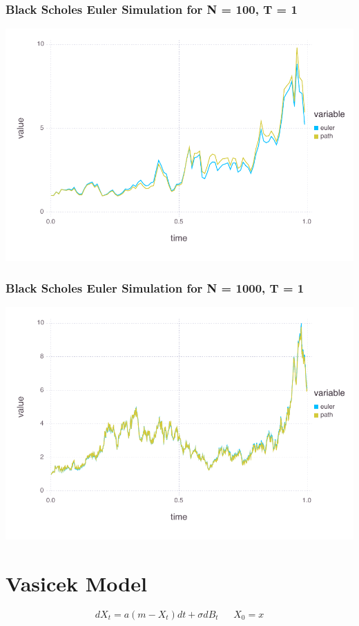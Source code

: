 \documentclass[a4paper,12pt]{article}
\begin{document}
\subsubsection*{Black Scholes Euler Simulation for N = 100, T = 1}
\includegraphics[width=\linewidth]{figures/problemset_3_1.pdf}



\subsubsection*{Black Scholes Euler Simulation for N = 1000, T = 1}
\includegraphics[width=\linewidth]{figures/problemset_4_1.pdf}


\section{Vasicek Model}
$$
dX_t = a(m - X_t)dt + \sigma dB_t \ \ \ \ \ \ \ X_0 = x
$$
%
\end{document}
